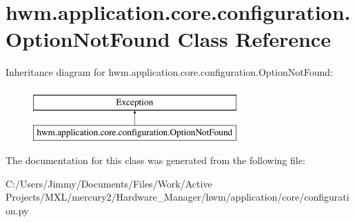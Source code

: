 \hypertarget{classhwm_1_1application_1_1core_1_1configuration_1_1_option_not_found}{\section{hwm.\-application.\-core.\-configuration.\-Option\-Not\-Found Class Reference}
\label{classhwm_1_1application_1_1core_1_1configuration_1_1_option_not_found}
}
Inheritance diagram for hwm.\-application.\-core.\-configuration.\-Option\-Not\-Found\-:\begin{figure}[H]
\begin{center}
\leavevmode
\includegraphics[height=2.000000cm]{classhwm_1_1application_1_1core_1_1configuration_1_1_option_not_found}
\end{center}
\end{figure}


The documentation for this class was generated from the following file\-:\begin{DoxyCompactItemize}
\item 
C\-:/\-Users/\-Jimmy/\-Documents/\-Files/\-Work/\-Active Projects/\-M\-X\-L/mercury2/\-Hardware\-\_\-\-Manager/hwm/application/core/configuration.\-py\end{DoxyCompactItemize}
